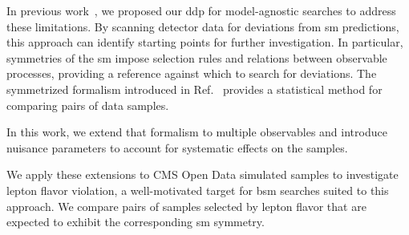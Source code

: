 In previous work~\cite{Volkovich_2022_DDP, Birman_2022_Symmetries, LastDDPPaper}, we proposed our \gls{ddp} for model-agnostic searches to address these limitations. By scanning detector data for deviations from \gls{sm} predictions, this approach can identify starting points for further investigation. In particular, symmetries of the \gls{sm} impose selection rules and relations between observable processes, providing a reference against which to search for deviations. The symmetrized formalism introduced in Ref.~\cite{LastDDPPaper} provides a statistical method for comparing pairs of data samples.

In this work, we extend that formalism to multiple observables and introduce nuisance parameters to account for systematic effects on the samples.

We apply these extensions to CMS Open Data simulated samples to investigate lepton flavor violation, a well-motivated target for \gls{bsm} searches suited to this approach. We compare pairs of samples selected by lepton flavor that are expected to exhibit the corresponding \gls{sm} symmetry.
